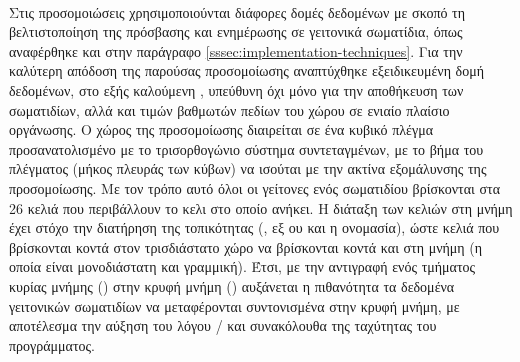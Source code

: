 \paragraph{} Στις προσομοιώσεις  χρησιμοποιούνται διάφορες δομές δεδομένων με
σκοπό τη βελτιστοποίηση της πρόσβασης και ενημέρωσης σε γειτονικά σωματίδια, όπως
αναφέρθηκε και στην παράγραφο \ref{sssec:implementation-techniques}. Για την καλύτερη
απόδοση της παρούσας προσομοίωσης αναπτύχθηκε εξειδικευμένη δομή δεδομένων, στο εξής
καλούμενη , υπεύθυνη όχι μόνο για την αποθήκευση των σωματιδίων, αλλά και
τιμών βαθμωτών πεδίων του χώρου σε ενιαίο πλαίσιο οργάνωσης. Ο χώρος της προσομοίωσης
διαιρείται σε ένα κυβικό πλέγμα προσανατολισμένο με το τρισορθογώνιο σύστημα
συντεταγμένων, με το βήμα του πλέγματος (μήκος πλευράς των κύβων) να ισούται με την ακτίνα
εξομάλυνσης της προσομοίωσης. Με τον τρόπο αυτό όλοι οι γείτονες ενός σωματιδίου
βρίσκονται στα 26 κελιά που περιβάλλουν το κελι στο οποίο ανήκει. Η διάταξη των κελιών στη
μνήμη έχει στόχο την διατήρηση της τοπικότητας (, εξ ου και η
ονομασία), ώστε κελιά που βρίσκονται κοντά στον τρισδιάστατο χώρο να βρίσκονται κοντά και
στη μνήμη (η οποία είναι μονοδιάστατη και γραμμική). Έτσι, με την αντιγραφή ενός τμήματος
κυρίας μνήμης () στην κρυφή μνήμη () αυξάνεται η πιθανότητα τα
δεδομένα γειτονικών σωματιδίων να μεταφέρονται συντονισμένα στην κρυφή μνήμη, με
αποτέλεσμα την αύξηση του λόγου / και συνακόλουθα της ταχύτητας του
προγράμματος.

